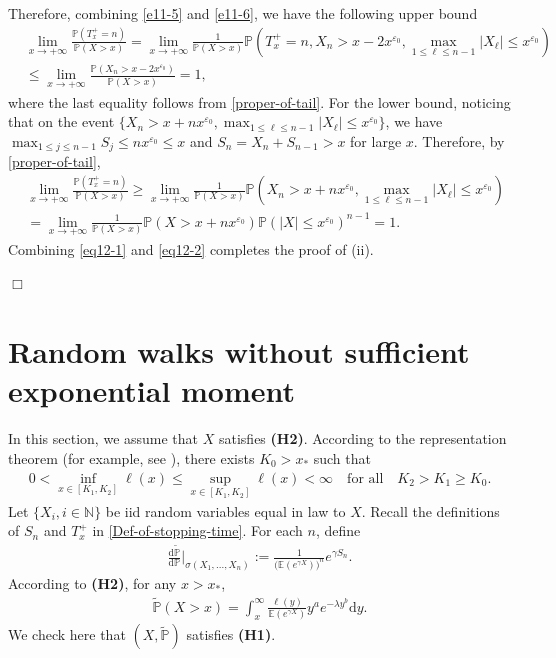 \documentclass[11pt]{article}
\numberwithin{equation}{section}
\begin{document}
Therefore, combining \eqref{e11-5} and \eqref{e11-6}, we have the following upper bound
\begin{align}\label{eq12-1}
	& \lim_{x\to+\infty} \frac{\mathbb{P}\left(T_x^+=n\right)}{\mathbb{P}(X>x)}  = \lim_{x\to+\infty} \frac{1}{\mathbb{P}(X>x)}\mathbb{P}\left(T_x^+=n,  X_n > x-2x^{\varepsilon_0}, \max_{1\leq  \ell \leq n-1} |X_\ell | \leq  x^{\varepsilon_0}\right) \nonumber\\
	&\leq \lim_{x\to+\infty} \frac{\mathbb{P}\left(X_n > x-2x^{\varepsilon_0}\right)}{\mathbb{P}(X>x)}=1,
\end{align}
where the last equality follows from \eqref{proper-of-tail}. For the lower bound, noticing that on the event $\{ X_n > x+nx^{\varepsilon_0},\max_{ 1\leq \ell \leq n-1} |X_\ell| \leq x^{\varepsilon_0}\}$, we have $\max_{1\leq j\leq n-1} S_j \leq nx^{\varepsilon_0} \leq x$ and $S_n =X_n+S_{n-1}>x$ for large $x$. Therefore,
by \eqref{proper-of-tail},   
\begin{align}\label{eq12-2}
	& \lim_{x\to+\infty} \frac{\mathbb{P}\left(T_x^+=n\right)}{\mathbb{P}(X>x)} \geq \lim_{x\to+\infty} \frac{1}{\mathbb{P}(X>x)}\mathbb{P}\left(X_n > x+nx^{\varepsilon_0},\max_{ 1\leq \ell \leq n-1} |X_\ell| \leq x^{\varepsilon_0} \right) \nonumber\\
	&= \lim_{x\to+\infty} \frac{1}{\mathbb{P}(X>x)}\mathbb{P}\left(X> x+nx^{\varepsilon_0}\right) \mathbb{P}\left( |X| \leq x^{\varepsilon_0} \right)^{n-1}=1.
\end{align}
Combining \eqref{eq12-1} and \eqref{eq12-2} completes the proof of (ii).

\hfill$\Box$



\section{Random walks without sufficient exponential moment}\label{S3}

 In this section, we assume that $X$ satisfies {\bf(H2)}. According to the representation theorem (for example, see \cite[Theorem 1.3.1, p.12]{BGT1987}), there exists $K_0>x_*$  such that 
 \begin{align}\label{Def-of-K-0}
 	0< \inf_{x\in [K_1, K_2]} \ell(x) \leq \sup_{x\in [K_1, K_2]} \ell(x)<\infty \quad\mbox{for all}\quad K_2>K_1\geq K_0.
 \end{align}
 Let $\{X_i, i\in\mathbb{N}\}$ be iid random variables equal in law to $X$. Recall the definitions of $S_n$ and $T_x^+$ in \eqref{Def-of-stopping-time}.  For each $n$, define 
 \begin{align}\label{Change-of-measure}
 	\frac{\mathrm{d} \widetilde{\mathbb{P}}}{\mathrm{d} \mathbb{P}}\bigg|_{\sigma(X_1,...,X_n)}:= \frac{1}{\big(\mathbb{E}(e^{\gamma X})\big)^n} e^{\gamma S_n}.
 \end{align}
 According to {\bf(H2)}, for any $x>x_*$,
 \begin{align}\label{density-X-tildeP}
 	\widetilde{\mathbb{P}}(X>x)= \int_x^\infty \frac{\ell(y)}{\mathbb{E}(e^{\gamma X})} y^a e^{-\lambda y^b}\mathrm{d}y.
 \end{align}
We check here that $(X, \widetilde{\mathbb P})$ satisfies {\bf(H1)}. 
\end{document}
